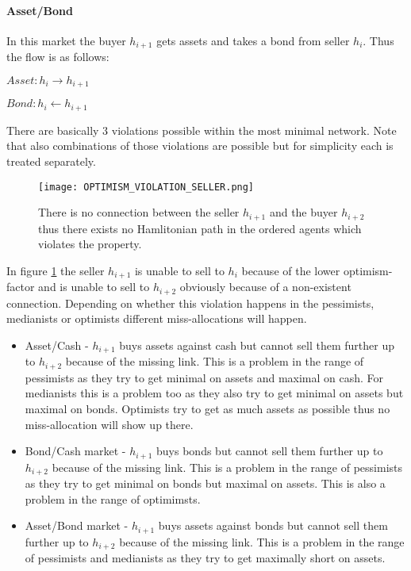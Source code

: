 \documentclass[Bachelorarbeit.tex]{subfiles}
\begin{document}
\paragraph{Asset/Bond} In this market the buyer $h_{i+1}$ gets assets and takes a bond from seller $h_i$. Thus the flow is as follows:
\begin{center}
$Asset: h_i \to h_{i+1}$
\end{center}
\begin{center}
$Bond: h_i \gets h_{i+1}$
\end{center}

\medskip

There are basically 3 violations possible within the most minimal network. Note that also combinations of those violations are possible but for simplicity each is treated separately.

\begin{figure}[H]
	\centering
  \texttt{[image: OPTIMISM\_VIOLATION\_SELLER.png]}
  	\caption{There is no connection between the seller $h_{i+1}$ and the buyer $h_{i+2}$ thus there exists no Hamlitonian path in the ordered agents which violates the property.}
	\label{fig:OPTIMISM_VIOLATION_SELLER}
\end{figure}

In figure \ref{fig:OPTIMISM_VIOLATION_SELLER} the seller $h_{i+1}$ is unable to sell to $h_i$ because of the lower optimism-factor and is unable to sell to $h_{i+2}$ obviously because of a non-existent connection. Depending on whether this violation happens in the pessimists, medianists or optimists different miss-allocations will happen.

\begin{itemize}
\item Asset/Cash - $h_{i+1}$ buys assets against cash but cannot sell them further up to $h_{i+2}$ because of the missing link. This is a problem in the range of pessimists as they try to get minimal on assets and maximal on cash. For medianists this is a problem too as they also try to get minimal on assets but maximal on bonds. Optimists try to get as much assets as possible thus no miss-allocation will show up there.
\item Bond/Cash market - $h_{i+1}$ buys bonds but cannot sell them further up to $h_{i+2}$ because of the missing link. This is a problem in the range of pessimists as they try to get minimal on bonds but maximal on assets. This is also a problem in the range of optimimsts.
\item Asset/Bond market - $h_{i+1}$ buys assets against bonds but cannot sell them further up to $h_{i+2}$ because of the missing link. This is a problem in the range of pessimists and medianists as they try to get maximally short on assets.
\end{itemize}
\end{document}

